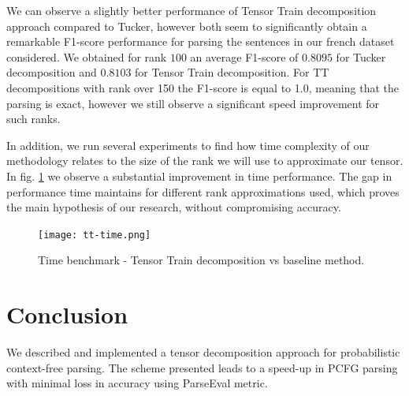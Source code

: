 \documentclass[conference]{IEEEtran}
\begin{document}
We can observe a slightly better performance of Tensor Train decomposition approach compared to Tucker, however both seem to significantly obtain a remarkable F1-score performance for parsing the sentences in our french dataset considered. We obtained for rank $100$ an average F1-score of $0.8095$ for Tucker decomposition and $0.8103$ for Tensor Train decomposition. For TT decompositions with rank over 150 the F1-score is equal to 1.0, meaning that the parsing is exact, however we still observe a significant speed improvement for such ranks.

In addition, we run several experiments to find how time complexity of our methodology relates to the size of the rank we will use to approximate our tensor. In fig. \ref{fig:tests_time} we observe a substantial improvement in time performance. The gap in performance time maintains for different rank approximations used, which proves the main hypothesis of our research, without compromising accuracy. 

\begin{figure}[H]
\centering
 \texttt{[image: tt-time.png]}
\caption{Time benchmark - Tensor Train decomposition vs baseline method.}
\label{fig:tests_time}
\end{figure}

\section{Conclusion}

We described and implemented a tensor decomposition approach for probabilistic context-free parsing. The scheme presented leads to a speed-up in PCFG parsing with minimal loss in accuracy using ParseEval metric.



%
\end{document}
